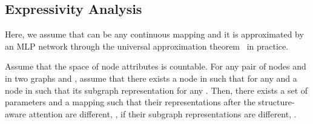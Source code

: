 \subsection{Expressivity Analysis}
Here, we assume that  can be any continuous mapping and it is approximated by an MLP network through the universal approximation theorem~\citep{hornik1991approximation} in practice.
\begin{theorem}
Assume that the space of node attributes  is countable. For any pair of nodes  and  in two graphs  and , assume that there exists a node  in  such that  for any  and a node  in  such that its subgraph representation  for any . Then, there exists a set of parameters and a mapping  such that their representations after the structure-aware attention are different, \ie , if their subgraph representations are different, \ie .
\end{theorem}
